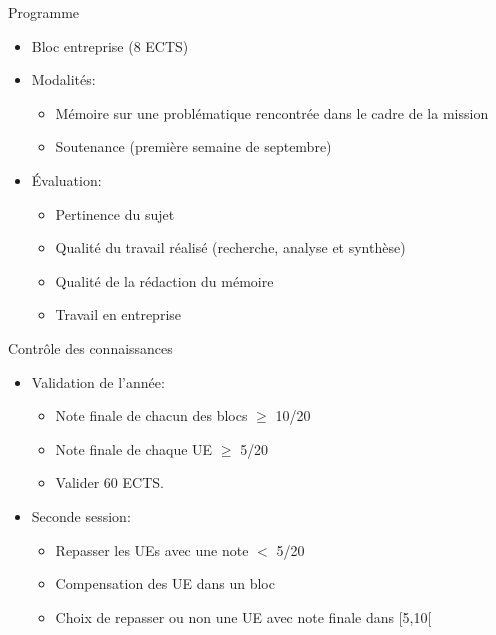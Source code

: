 \documentclass[minimal,compress]{beamer}
\begin{document}
\begin{frame}{Programme}

\begin{itemize}
\item \alert{Bloc entreprise} (8 ECTS)
\end{itemize}

\begin{itemize}
\item Modalités:
\begin{itemize}
\item Mémoire sur une problématique rencontrée dans le cadre de la mission
\item Soutenance (première semaine de septembre)
\end{itemize}
\item Évaluation:
\begin{itemize}
\item Pertinence du sujet
\item Qualité du travail réalisé (recherche, analyse et synthèse)
\item Qualité de la rédaction du mémoire
\item Travail en entreprise
\end{itemize}

\end{itemize}

\end{frame}


\begin{frame}{Contrôle des connaissances}
\begin{itemize}
\item Validation de l’année:
\begin{itemize}
\item Note finale de \alert{chacun des blocs} $\geq$ \alert{10}/20
\item Note finale de \alert{chaque UE} $\geq$ \alert{5}/20
\item Valider 60 ECTS.
\end{itemize}
\item Seconde session:
\begin{itemize}
\item Repasser les UEs avec une note $<$ \alert{5/20}
\item Compensation des UE dans un bloc
\item Choix de repasser ou non une UE avec note finale dans [5,10[
\end{itemize}
\end{itemize}
\end{frame}
\end{document}
